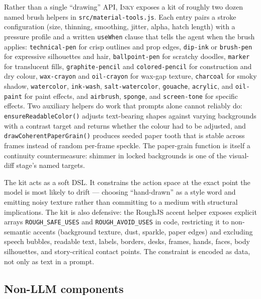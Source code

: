 \documentclass[10pt,twocolumn]{article}
\newcommand{\inky}{\textsc{Inky}}
\begin{document}
Rather than a single ``drawing'' API, \inky{} exposes a kit of
roughly two dozen named brush helpers in
\texttt{src/material-tools.js}. Each entry pairs a stroke
configuration (size, thinning, smoothing, jitter, alpha, hatch
length) with a pressure profile and a written \texttt{useWhen}
clause that tells the agent when the brush applies:
\texttt{technical-pen} for crisp outlines and prop edges,
\texttt{dip-ink} or \texttt{brush-pen} for expressive silhouettes
and hair, \texttt{ballpoint-pen} for scratchy doodles,
\texttt{marker} for translucent fills, \texttt{graphite-pencil}
and \texttt{colored-pencil} for construction and dry colour,
\texttt{wax-crayon} and \texttt{oil-crayon} for wax-gap texture,
\texttt{charcoal} for smoky shadow, \texttt{watercolor},
\texttt{ink-wash}, \texttt{salt-watercolor}, \texttt{gouache},
\texttt{acrylic}, and \texttt{oil-paint} for paint effects, and
\texttt{airbrush}, \texttt{sponge}, and \texttt{screen-tone} for
specific effects. Two auxiliary helpers do work that prompts
alone cannot reliably do: \texttt{ensureReadableColor()} adjusts
text-bearing shapes against varying backgrounds with a contrast
target and returns whether the colour had to be adjusted, and
\texttt{drawCoherentPaperGrain()} produces seeded paper tooth
that is stable across frames instead of random per-frame
speckle. The paper-grain function is itself a continuity
countermeasure: shimmer in locked backgrounds is one of the
visual-diff stage's named targets.

The kit acts as a soft DSL. It constrains the action space at
the exact point the model is most likely to drift --- choosing
``hand-drawn'' as a style word and emitting noisy texture rather
than committing to a medium with structural implications. The
kit is also defensive: the RoughJS accent helper exposes
explicit arrays \texttt{ROUGH\_SAFE\_USES} and
\texttt{ROUGH\_AVOID\_USES} in code, restricting it to non-
semantic accents (background texture, dust, sparkle, paper
edges) and excluding speech bubbles, readable text, labels,
borders, desks, frames, hands, faces, body silhouettes, and
story-critical contact points. The constraint is encoded as
data, not only as text in a prompt.

\subsection{Non-LLM components}
\end{document}
